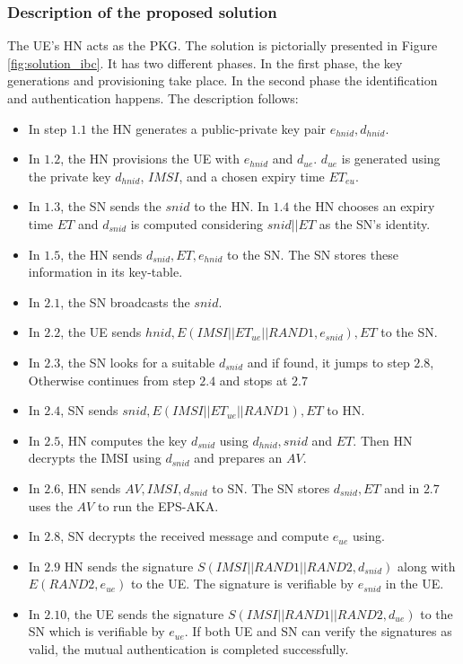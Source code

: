 \documentclass{river-journal}
\begin{document}
\subsubsection{Description of the proposed solution}
The UE's HN acts as the PKG. The solution is pictorially presented in Figure \ref{fig:solution_ibc}. It has two different phases. In the first phase, the key generations and provisioning take place. In the second phase the identification and authentication happens. The description follows:

\begin{itemize}
\item In step $1.1$ the HN generates a public-private key pair $e_{hnid},d_{hnid}$.
\item In $1.2$, the HN provisions the UE with $e_{hnid}$ and $d_{ue}$. $d_{ue}$ is generated using the private key $d_{hnid}$, $IMSI$, and a chosen expiry time $ET_{eu}$. 
\item In  $1.3$, the SN sends the $snid$ to the HN. In  $1.4$ the HN chooses an expiry time $ET$ and $d_{snid}$ is computed considering $snid||ET$ as the SN's identity. 
\item In  $1.5$, the HN sends $d_{snid},ET,e_{hnid}$ to the SN. The SN stores these information in its key-table. 
\item In  $2.1$, the SN broadcasts the $snid$. 
\item In  $2.2$, the UE sends $hnid,E(IMSI||ET_{ue}||RAND1,e_{snid}),ET$ to the SN. 
\item In  $2.3$, the SN looks for a suitable $d_{snid}$ and if found, it jumps to step $2.8$, Otherwise continues from step $2.4$ and stops at $2.7$
\item In $2.4$, SN sends $snid,E(IMSI||ET_{ue}||RAND1),ET$ to HN. 
\item In $2.5$, HN computes the key $d_{snid}$ using $d_{hnid},snid$ and $ET$. Then HN decrypts the IMSI using $d_{snid}$ and  prepares an $AV$.
\item In $2.6$, HN sends  $AV,IMSI,d_{snid}$ to SN. The SN stores $d_{snid},ET$ and in $2.7$ uses the $AV$ to run the EPS-AKA.
\item In $2.8$, SN decrypts the received message and compute $e_{ue}$ using. 
\item In $2.9$ HN sends the signature $S(IMSI||RAND1||RAND2,d_{snid})$ along with $E(RAND2,e_{ue})$ to the UE. The signature is verifiable by $e_{snid}$ in the UE. 
\item In $2.10$, the UE sends the signature $S(IMSI||RAND1||RAND2,d_{ue})$ to the SN which is verifiable by $e_{ue}$. If both UE and SN can verify the signatures as valid, the mutual authentication is completed successfully.
\end{itemize}
\end{document}
